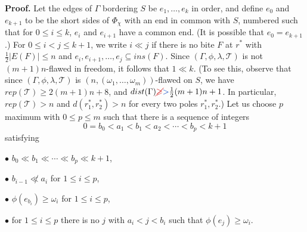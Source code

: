 \textbf{Proof.} Let the edges of $\Gamma$ bordering $S$ be $e_1, \dots, e_k$ in order, and define $e_0$ and $e_{k+1}$ to be the short sides of $\Phi_\chi$ with an end in common with $S$, numbered such that for $0 \le i \le k$, $e_i$ and $e_{i+1}$ have a common end. (It is possible that $e_0 = e_{k+1}$.) For $0 \le i < j \le k + 1$, we write $i \ll j$ if there is no bite $F$ at $r^*$ with $\frac{1}{2}|E(F)| \le n$ and $e_i, e_{i+1}, \dots, e_j \subseteq ins(F)$. Since $(\Gamma, \phi, \lambda, \mathscr{T})$ is not $(m + 1)n$-flawed in freedom, it follows that $1 \ll k$. (To see this, observe that since $(\Gamma, \phi, \lambda, \mathscr{T})$ is $(n, (\omega_1, \dots, \omega_m))$-flawed on $S$, we have $rep(\mathscr{T}) \ge 2(m + 1)n + 8$, and $dist(\Gamma) \delm{\ge}\fix{>} \frac{1}{2}(m + 1)n + 1$. In particular,  $rep(\mathscr{T}) > n$ and $d(r^*_1, r^*_2) > n$ for every two poles $r^*_1, r^*_2$.) Let us choose $p$ maximum with $0 \le p \le m$ such that there is a sequence of integers
\begin{equation*}
0 = b_0 < a_1 < b_1 < a_2 < \cdots < b_p < k + 1
\end{equation*}
satisfying

\hspace*{12pt}$\bullet$ $b_0 \ll b_1 \ll \cdots \ll b_p \ll k + 1$,

\hspace*{12pt}$\bullet$ $b_{i-1} \not\ll a_i$ for $1 \le i \le p$,

\hspace*{12pt}$\bullet$ $\phi(e_{b_i}) \ge \omega_i$ for $1 \le i \le p$,

\hspace*{12pt}$\bullet$ for $1 \le i \le p$ there is no $j$ with $a_i < j < b_i$ such that $\phi(e_j) \ge \omega_i$.
